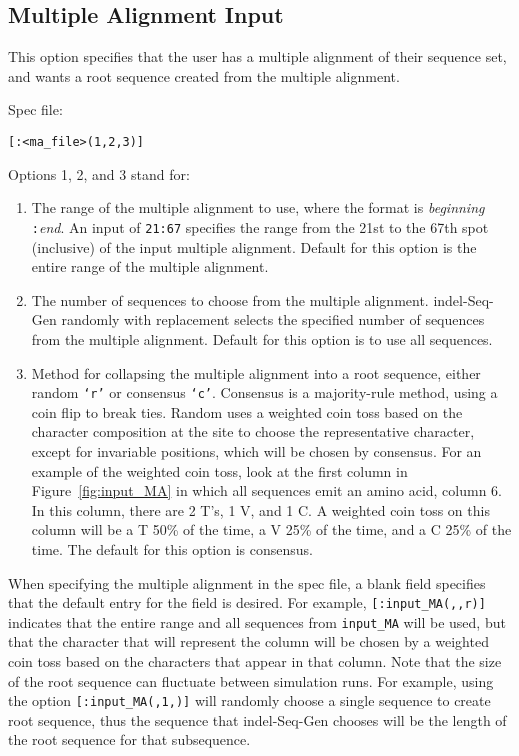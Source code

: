 \documentclass[10pt]{article}
\begin{document}
\subsection{Multiple Alignment Input}

This option specifies that the user has a multiple alignment of their sequence set, and 
wants a root sequence created from the multiple alignment. 

Spec file:
\begin{verbatim}
[:<ma_file>(1,2,3)]
\end{verbatim}

Options 1, 2, and 3 stand for:
\begin{enumerate}
\item The range of the multiple alignment to use, where the format is {\it beginning}{\tt 
:}{\it end}.  An input of {\tt 21:67} specifies the range from the 21st to the 67th spot 
(inclusive) of the input multiple alignment.  Default for this option is the entire range of 
the multiple alignment. 
\item The number of sequences to choose from the multiple alignment.  indel-Seq-Gen randomly 
with replacement selects the specified number of sequences from the multiple alignment.  
Default for this option is to use all sequences.
\item Method for collapsing the multiple alignment into a root sequence, either random 
{\tt `r'} or consensus {\tt `c'}.  Consensus is a majority-rule method, using a coin flip to 
break ties.  Random uses a weighted coin toss based on the character composition at the site 
to choose the representative character, except for invariable positions, which will be chosen by consensus.  
For an example of the weighted coin toss, look at the first column in 
Figure~\ref{fig:input_MA} in which all sequences emit an amino acid, column 6.  In this 
column, there are 2 T's, 1 V, and 1 C.  A weighted coin toss on this column will be a T 50\% 
of the time, a V 25\% of the time, and a C 25\% of the time. The default for this option is 
consensus.
\end{enumerate}

When specifying the multiple alignment in the spec file, a blank field specifies that the default
entry for the field is desired.  For example, \verb+[:input_MA(,,r)]+ indicates that the entire range and
all sequences from {\tt input\_MA} will be used, but that the character that will
represent the column will be chosen by a weighted coin toss based on the characters that
appear in that column.  Note that the size of the root sequence can fluctuate 
between simulation runs.  For example, using the option \verb+[:input_MA(,1,)]+ will 
randomly choose a single sequence to create root sequence, thus the sequence that 
indel-Seq-Gen chooses will be the length of the root sequence for that subsequence.\\
\end{document}
